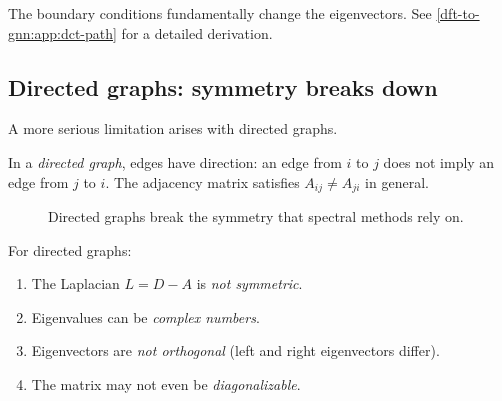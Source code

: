 \begin{notechapter}
\begin{example}
The boundary conditions fundamentally change the eigenvectors. See
\cref{dft-to-gnn:app:dct-path} for a detailed derivation.
\end{example}

\subsection{Directed graphs: symmetry breaks down}

A more serious limitation arises with directed graphs.

\begin{definition}
In a \emph{directed graph}, edges have direction: an edge from $i$
to $j$ does not imply an edge from $j$ to $i$. The adjacency matrix
satisfies $A_{ij} \neq A_{ji}$ in general.
\end{definition}

\begin{figure}[H]
\centering
{}
\caption{Directed graphs break the symmetry that spectral methods
         rely on.}
\end{figure}

For directed graphs:
\begin{enumerate}
    \item The Laplacian $L = D - A$ is \emph{not symmetric}.
    \item Eigenvalues can be \emph{complex numbers}.
    \item Eigenvectors are \emph{not orthogonal} (left and right
          eigenvectors differ).
    \item The matrix may not even be \emph{diagonalizable}.
\end{enumerate}


\end{notechapter}
